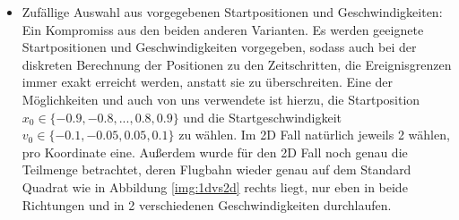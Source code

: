 \begin{description}
\begin{itemize}
		\item Zufällige Auswahl aus vorgegebenen Startpositionen und Geschwindigkeiten: Ein Kompromiss aus den beiden anderen Varianten. Es werden geeignete Startpositionen und Geschwindigkeiten vorgegeben, sodass auch bei der diskreten Berechnung der Positionen zu den Zeitschritten, die Ereignisgrenzen immer exakt erreicht werden, anstatt sie zu überschreiten. Eine der Möglichkeiten und auch von uns verwendete ist hierzu, die Startposition $ x_{0} \in \{-0.9,-0.8, ... ,0.8,0.9\} $ und die Startgeschwindigkeit $ v_{0} \in \{-0.1,-0.05,0.05,0.1\} $ zu wählen. Im 2D Fall natürlich jeweils 2 wählen, pro Koordinate eine. Außerdem wurde für den 2D Fall noch genau die Teilmenge betrachtet, deren Flugbahn wieder genau auf dem Standard Quadrat wie in Abbildung \ref{img:1dvs2d} rechts liegt, nur eben in beide Richtungen und in 2 verschiedenen Geschwindigkeiten durchlaufen. 
		

\end{itemize}
\end{description}
